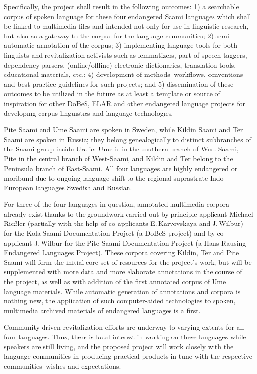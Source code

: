 \documentclass[a4paper,12pt]{article}
\begin{document}
Specifically, the project shall result in the following outcomes: 1) a searchable corpus of spoken language for these four endangered Saami languages which shall be linked to multimedia files and intended not only for use in linguistic research, but also as a gateway to the corpus for the language communities; 2) semi-automatic annotation of the corpus; 3) implementing language tools for both linguists and revitalization activists such as lemmatizers, part-of-speech taggers, dependency parsers, (online/offline) electronic dictionaries, translation tools, educational materials, etc.; 4) development of methods, workflows, conventions and best-practice guidelines for such projects; and
5) dissemination of these outcomes to be utilized in the future as at least a template or source of inspiration for other DoBeS, ELAR and other endangered language projects for developing corpus linguistics and language technologies.

Pite Saami and Ume Saami are spoken in Sweden, while Kildin Saami and Ter Saami are spoken in Russia; they belong genealogically to distinct subbranches of the Saami group inside Uralic: Ume is in the southern branch of West-Saami, Pite in the central branch of West-Saami, and Kildin and Ter belong to the Peninsula branch of East-Saami. All four languages are highly endangered or moribund due to ongoing language shift to the regional suprastrate Indo-European languages Swedish and Russian.

For three of the four languages in question, annotated multimedia corpora already exist thanks to the groundwork carried out by principle applicant Michael Rießler (partially with the help of co-applicants E.\,Karvovskaya and J.\,Wilbur) for the Kola Saami Documentation Project (a DoBeS project) and by co-applicant J.\,Wilbur for the Pite Saami Documentation Project (a Hans Rausing Endangered Languages Project). These corpora covering Kildin, Ter and Pite Saami will form the initial core set of resources for the project's work, but will be supplemented with more data and more elaborate annotations in the course of the project, as well as with addition of the first annotated corpus of Ume language materials. While automatic generation of annotations and corpora is nothing new, the application of such computer-aided technologies to spoken, multimedia archived materials of endangered languages is a first.

Community-driven revitalization efforts are underway to varying extents for all four languages. Thus, there is local interest in working on these languages while speakers are still living, and the proposed project will work closely with the language communities in producing practical products in tune with the respective communities' wishes and expectations.
\end{document}
